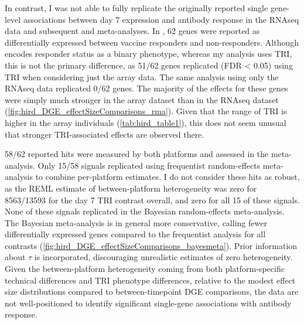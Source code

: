 In contrast, I was not able to fully replicate the originally reported single gene-level associations between day 7 expression and antibody response in the \gls{RNAseq} data and subsequent and meta-analyses.
In \autocite{sobolev2016AdjuvantedInfluenzaH1N1Vaccination}, 62 genes were reported as differentially expressed between vaccine responders and non-responders.
Although \autocite{sobolev2016AdjuvantedInfluenzaH1N1Vaccination} encodes responder status as a binary phenotype, whereas my analysis uses \gls{TRI}, this is not the primary difference, as 51/62 genes replicated (\gls{FDR} < 0.05) using \gls{TRI} when considering just the array data.
The same analysis using only the \gls{RNAseq} data replicated 0/62 genes.
The majority of the effects for these genes were simply much stronger in the array dataset than in the RNAseq dataset (\autoref{fig:hird_DGE_effectSizeComparisons_rma}).
Given that the range of \gls{TRI} is higher in the array individuals (\autoref{tab:hird_table1}), this does not seem unusual that stronger \gls{TRI}-associated effects are observed there.
%

58/62 reported hits were measured by both platforms and assessed in the meta-analysis.
Only 15/58 signals replicated using frequentist random-effects meta-analysis to combine per-platform estimates.
I do not consider these hits as robust, as the \gls{REML} estimate of between-platform heterogeneity was zero for 8563/13593 for the day 7 TRI contrast overall, and zero for all 15 of these signals.
None of these signals replicated in the Bayesian random-effects meta-analysis.
The Bayesian meta-analysis is in general more conservative, calling fewer differentially expressed genes compared to the frequentist analysis for all contrasts (\autoref{fig:hird_DGE_effectSizeComparisons_bayesmeta}).
Prior information about $\tau$ is incorporated, discouraging unrealistic estimates of zero heterogeneity.
Given the between-platform heterogeneity coming from both platform-specific technical differences and \gls{TRI} phenotype differences, relative to the modest effect size distributions compared to between-timepoint \gls{DGE} comparisons, the data are not well-positioned to identify significant single-gene associations with antibody response.
%

